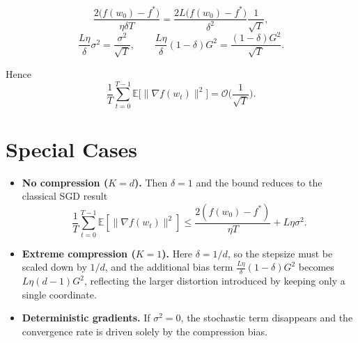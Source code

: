 \documentclass{article}
\newcommand{\E}{\mathbb{E}}
\begin{document}
\[
\frac{2\big(f(w_{0})-f^{*}\big)}{\eta\delta T}
   =\frac{2L\big(f(w_{0})-f^{*}\big)}{\delta^{2}}\frac{1}{\sqrt{T}},
\]
\[
\frac{L\eta}{\delta}\sigma^{2}
   =\frac{\sigma^{2}}{\sqrt{T}},\qquad
\frac{L\eta}{\delta}(1-\delta)G^{2}
   =\frac{(1-\delta)G^{2}}{\sqrt{T}}.
\]

Hence
\[
\frac{1}{T}\sum_{t=0}^{T-1}\E\!\big[\|\nabla f(w_{t})\|^{2}\big]
 =\mathcal{O}\!\Big(\frac{1}{\sqrt{T}}\Big).
\]

\section*{Special Cases}
\begin{itemize}
\item \textbf{No compression ($K=d$).} Then $\delta=1$ and the bound reduces to the classical SGD result
\[
\frac{1}{T}\sum_{t=0}^{T-1}\E[\|\nabla f(w_{t})\|^{2}]
 \le \frac{2(f(w_{0})-f^{*})}{\eta T}+L\eta\sigma^{2}.
\]
\item \textbf{Extreme compression ($K=1$).} Here $\delta=1/d$, so the stepsize must be scaled down by $1/d$, and the additional bias term $\frac{L\eta}{\delta}(1-\delta)G^{2}$ becomes $L\eta(d-1)G^{2}$, reflecting the larger distortion introduced by keeping only a single coordinate.
\item \textbf{Deterministic gradients.} If $\sigma^{2}=0$, the stochastic term disappears and the convergence rate is driven solely by the compression bias.
\end{itemize}
\end{document}

